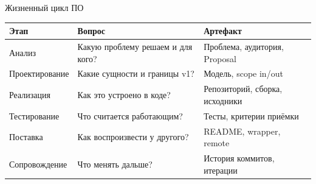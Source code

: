 \begin{frame}{Жизненный цикл ПО}
  \vspace{0.2em}
  \small
  \begin{tabular}{@{}p{}p{}p{}@{}}
    \toprule
    \textbf{Этап} & \textbf{Вопрос} & \textbf{Артефакт}\\
    \midrule
    Анализ
      & Какую проблему решаем и для кого?
      & Проблема, аудитория, Proposal \\
    \addlinespace[0.28em]
    Проектирование
      & Какие сущности и границы v1?
      & Модель, scope in/out \\
    \addlinespace[0.28em]
    Реализация
      & Как это устроено в коде?
      & Репозиторий, сборка, исходники \\
    \addlinespace[0.28em]
    Тестирование
      & Что считается работающим?
      & Тесты, критерии приёмки \\
    \addlinespace[0.28em]
    Поставка
      & Как воспроизвести у другого?
      & README, wrapper, remote \\
    \addlinespace[0.28em]
    Сопровождение
      & Что менять дальше?
      & История коммитов, итерации \\
    \bottomrule
  \end{tabular}
\end{frame}
